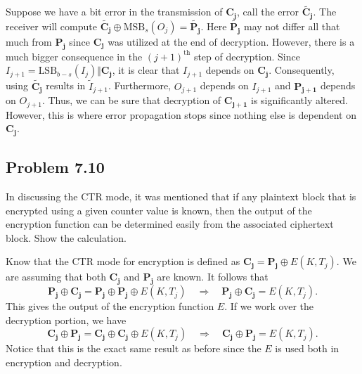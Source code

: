 \documentclass[../hw_sols.tex]{subfiles}
\begin{document}
\begin{solution}
Suppose we have a bit error in the transmission of $\mathbf{C_j}$, call the 
error $\mathbf{\tilde{C_j}}$. The receiver will compute 
$\mathbf{\tilde{C_j}} \oplus \text{MSB}_s(O_j) = \mathbf{\tilde{P_j}}$. Here 
$\mathbf{\tilde{P_j}}$ may not differ all that much from $\mathbf{P_j}$ since 
$\mathbf{C_j}$ was utilized at the end of decryption. However, there is a 
much bigger consequence in the $(j+1)^{\text{th}}$ step of decryption. Since 
$I_{j+1} = \text{LSB}_{b-s}(I_j) \Vert \mathbf{C_j}$, it is clear that 
$I_{j+1}$ depends on $\mathbf{C_j}$. Consequently, using 
$\mathbf{\tilde{C_j}}$ results in $\tilde{I}_{j+1}$. Furthermore, $O_{j+1}$ 
depends on $I_{j+1}$ and $\mathbf{P_{j+1}}$ depends on $O_{j+1}$. Thus, we can 
be sure that decryption of $\mathbf{C_{j+1}}$ is significantly altered. 
However, this is where error propagation stops since nothing else is dependent 
on $\mathbf{C_j}$.
\end{solution}


\newpage



\subsection*{Problem 7.10}

In discussing the CTR mode, it was mentioned that if any plaintext block that 
is encrypted using a given counter value is known, then the output of the 
encryption function can be determined easily from the associated ciphertext 
block. Show the calculation.

\begin{solution}
Know that the CTR mode for encryption is defined as 
$\mathbf{C_j} = \mathbf{P_j} \oplus E(K,T_j)$. We are assuming that both 
$\mathbf{C_j}$ and $\mathbf{P_j}$ are known. It follows that 
	$$\mathbf{P_j} \oplus \mathbf{C_j} 
	= \mathbf{P_j} \oplus \mathbf{P_j} \oplus E(K,T_j) 
	\quad \Rightarrow \quad 
	\mathbf{P_j} \oplus \mathbf{C_j} = E(K,T_j).$$
This gives the output of the encryption function $E$. If we work over the 
decryption portion, we have
	$$\mathbf{C_j} \oplus \mathbf{P_j} 
	= \mathbf{C_j} \oplus \mathbf{C_j} \oplus E(K,T_j) 
	\quad \Rightarrow \quad 
	\mathbf{C_j} \oplus \mathbf{P_j} = E(K,T_j).$$
Notice that this is the exact same result as before since the $E$ is used both 
in encryption and decryption.
\end{solution}
\end{document}

